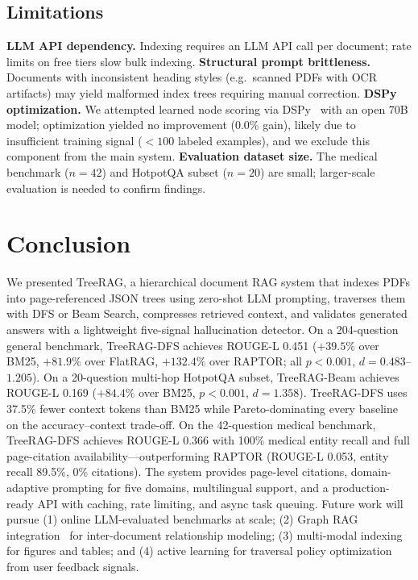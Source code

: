 \documentclass[sigconf,review,anonymous]{acmart}
\begin{document}
\subsection{Limitations}
\textbf{LLM API dependency.} Indexing requires an LLM API call per document; rate
limits on free tiers slow bulk indexing. \textbf{Structural prompt brittleness.}
Documents with inconsistent heading styles (e.g.\ scanned PDFs with OCR
artifacts) may yield malformed index trees requiring manual correction.
\textbf{DSPy optimization.} We attempted learned node scoring via
DSPy~\cite{khattab2024dspy} with an open 70B model; optimization yielded no
improvement (0.0\% gain), likely due to insufficient training signal ($<100$
labeled examples), and we exclude this component from the main system.
\textbf{Evaluation dataset size.} The medical benchmark ($n=42$) and HotpotQA
subset ($n=20$) are small; larger-scale evaluation is needed to confirm findings.

\section{Conclusion}
\label{sec:conclusion}
We presented TreeRAG, a hierarchical document RAG system that indexes PDFs into
page-referenced JSON trees using zero-shot LLM prompting, traverses them with DFS
or Beam Search, compresses retrieved context, and validates generated answers
with a lightweight five-signal hallucination detector. On a 204-question general
benchmark, TreeRAG-DFS achieves ROUGE-L 0.451 ($+39.5\%$ over BM25, $+81.9\%$
over FlatRAG, $+132.4\%$ over RAPTOR; all $p<0.001$, $d=0.483$--$1.205$). On a
20-question multi-hop HotpotQA subset, TreeRAG-Beam achieves ROUGE-L 0.169
($+84.4\%$ over BM25, $p<0.001$, $d=1.358$). TreeRAG-DFS uses 37.5\% fewer
context tokens than BM25 while Pareto-dominating every baseline on the
accuracy--context trade-off. On the 42-question medical benchmark, TreeRAG-DFS
achieves ROUGE-L 0.366 with 100\% medical entity recall and full page-citation
availability---outperforming RAPTOR (ROUGE-L 0.053, entity recall 89.5\%, 0\%
citations). The system provides page-level citations, domain-adaptive prompting
for five domains, multilingual support, and a production-ready API with caching,
rate limiting, and async task queuing. Future work will pursue (1) online
LLM-evaluated benchmarks at scale; (2) Graph RAG integration~\cite{edge2025graphrag}
for inter-document relationship modeling; (3) multi-modal indexing for figures
and tables; and (4) active learning for traversal policy optimization from user
feedback signals.
\end{document}

